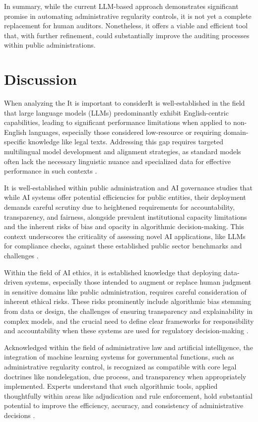 \documentclass[../main.tex]{subfiles}
\begin{document}
\bigskip

\noindent In summary, while the current LLM-based approach demonstrates significant promise in automating administrative regularity controls, it is not yet a complete replacement for human auditors. Nonetheless, it offers a viable and efficient tool that, with further refinement, could substantially improve the auditing processes within public administrations.

\section{Discussion}
When analyzing the It is important to considerIt is well-established in the field that large language models (LLMs) predominantly exhibit English-centric capabilities, leading to significant performance limitations when applied to non-English languages, especially those considered low-resource or requiring domain-specific knowledge like legal texts. Addressing this gap requires targeted multilingual model development and alignment strategies, as standard models often lack the necessary linguistic nuance and specialized data for effective performance in such contexts \cite{qinSurveyMultilingualLarge2025}.

It is well-established within public administration and AI governance studies that while AI systems offer potential efficiencies for public entities, their deployment demands careful scrutiny due to heightened requirements for accountability, transparency, and fairness, alongside prevalent institutional capacity limitations and the inherent risks of bias and opacity in algorithmic decision-making. This context underscores the criticality of assessing novel AI applications, like LLMs for compliance checks, against these established public sector benchmarks and challenges \cite{hickokPublicProcurementArtificial2022}.

Within the field of AI ethics, it is established knowledge that deploying data-driven systems, especially those intended to augment or replace human judgment in sensitive domains like public administration, requires careful consideration of inherent ethical risks. These risks prominently include algorithmic bias stemming from data or design, the challenges of ensuring transparency and explainability in complex models, and the crucial need to define clear frameworks for responsibility and accountability when these systems are used for regulatory decision-making \cite{christoforakiAIEthicsBirds2022}.

Acknowledged within the field of administrative law and artificial intelligence, the integration of machine learning systems for governmental functions, such as administrative regularity control, is recognized as compatible with core legal doctrines like nondelegation, due process, and transparency when appropriately implemented. Experts understand that such algorithmic tools, applied thoughtfully within areas like adjudication and rule enforcement, hold substantial potential to improve the efficiency, accuracy, and consistency of administrative decisions \cite{coglianeseRegulatingRobotAdministrative2017}. 

\ifSubfilesClassLoaded{
    
    
}{}
\end{document}
